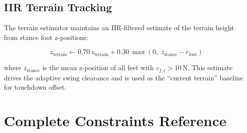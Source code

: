 \documentclass[12pt,a4paper]{report}
\begin{document}
\section{IIR Terrain Tracking}

The terrain estimator maintains an IIR-filtered estimate of the terrain height
from stance foot z-positions:

\begin{equation}
    z_\text{terrain} \leftarrow 0.70\,z_\text{terrain} + 0.30\,\max\!\left(0,\;
    \overline{z}_\text{stance} - r_\text{foot}\right)
\end{equation}

where $\overline{z}_\text{stance}$ is the mean z-position of all feet with
$c_{f,i} > 10\,\text{N}$.  This estimate drives the adaptive swing clearance
and is used as the ``current terrain'' baseline for touchdown offset.

\chapter{Complete Constraints Reference}
\end{document}
